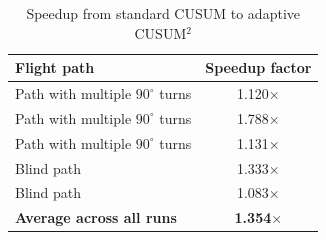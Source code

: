 \begin{table}[!ht]
\centering
\scriptsize
\caption{Speedup from standard CUSUM to adaptive CUSUM$^2$}
\label{tab:cusum_to_adaptive_cusum2_speedup}
\begin{tabular}{|p{}|c|}
\hline
\textbf{Flight path} & \textbf{Speedup factor} \\
\hline
Path with multiple $90^\circ$ turns & 1.120$\times$ \\
\hline
Path with multiple $90^\circ$ turns & 1.788$\times$ \\
\hline
Path with multiple $90^\circ$ turns & 1.131$\times$ \\
\hline
Blind path & 1.333$\times$ \\
\hline
Blind path & 1.083$\times$ \\
\hline
\textbf{Average across all runs} & \textbf{1.354$\times$} \\
\hline
\end{tabular}
\end{table}
